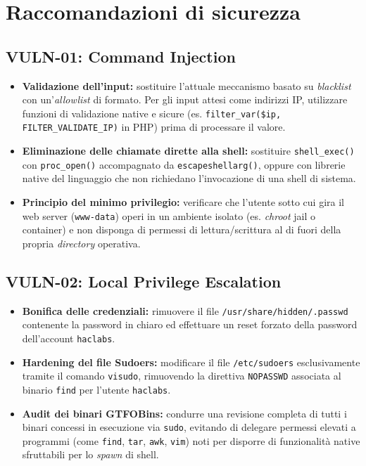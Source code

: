 \documentclass[11pt]{report}
\begin{document}
	\section{Raccomandazioni di sicurezza}
	
	\subsection{VULN-01: Command Injection}
	\begin{itemize}[leftmargin=*]
		\item \textbf{Validazione dell'input:} sostituire l'attuale meccanismo basato su \textit{blacklist} con un'\textit{allowlist} di formato. Per gli input attesi come indirizzi IP, utilizzare funzioni di validazione native e sicure (es. \texttt{filter\_var(\$ip, FILTER\_VALIDATE\_IP)} in PHP) prima di processare il valore.
		\item \textbf{Eliminazione delle chiamate dirette alla shell:} sostituire \texttt{shell\_exec()} con \texttt{proc\_open()} accompagnato da \texttt{escapeshellarg()}, oppure con librerie native del linguaggio che non richiedano l'invocazione di una shell di sistema.
		\item \textbf{Principio del minimo privilegio:} verificare che l'utente sotto cui gira il web server (\texttt{www-data}) operi in un ambiente isolato (es. \textit{chroot} jail o container) e non disponga di permessi di lettura/scrittura al di fuori della propria \textit{directory} operativa.
	\end{itemize}
	
	\subsection{VULN-02: Local Privilege Escalation}
	\begin{itemize}[leftmargin=*]
		\item \textbf{Bonifica delle credenziali:} rimuovere il file \texttt{/usr/share/hidden/.passwd} contenente la password in chiaro ed effettuare un reset forzato della password dell'account \texttt{haclabs}.
		\item \textbf{Hardening del file Sudoers:} modificare il file \texttt{/etc/sudoers} esclusivamente tramite il comando \texttt{visudo}, rimuovendo la direttiva \texttt{NOPASSWD} associata al binario \texttt{find} per l'utente \texttt{haclabs}.
		\item \textbf{Audit dei binari GTFOBins:} condurre una revisione completa di tutti i binari concessi in esecuzione via \texttt{sudo}, evitando di delegare permessi elevati a programmi (come \texttt{find}, \texttt{tar}, \texttt{awk}, \texttt{vim}) noti per disporre di funzionalità native sfruttabili per lo \textit{spawn} di shell.
	\end{itemize}
	
\end{document}
